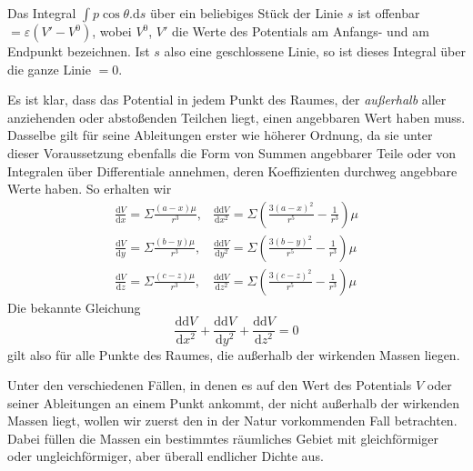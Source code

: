 Das Integral $\int p\cos\theta.\mathrm{d}s$ über ein beliebiges Stück der Linie $s$ ist offenbar $=\varepsilon(V'-V^0)$, wobei $V^0$, $V'$ die Werte des Potentials am Anfangs- und am Endpunkt bezeichnen. Ist $s$ also eine geschlossene Linie, so ist dieses Integral über die ganze Linie $=0$.

Es ist klar, dass das Potential in jedem Punkt des Raumes, der \textit{außerhalb} aller anziehenden oder abstoßenden Teilchen liegt, einen angebbaren Wert haben muss. Dasselbe gilt für seine Ableitungen erster wie höherer Ordnung, da sie unter dieser Voraussetzung ebenfalls die Form von Summen angebbarer Teile oder von Integralen über Differentiale annehmen, deren Koeffizienten durchweg angebbare Werte haben. So erhalten wir
\[
\begin{array}{ll}
\displaystyle\frac{\mathrm{d}V}{\mathrm{d}x}=\Sigma\frac{(a-x)\mu}{r^3},&\displaystyle\frac{\mathrm{d}\mathrm{d}V}{\mathrm{d}x^2}=\Sigma(\frac{3(a-x)^2}{r^5}-\frac{1}{r^3})\mu\\[6pt]
\displaystyle\frac{\mathrm{d}V}{\mathrm{d}y}=\Sigma\frac{(b-y)\mu}{r^3},&\displaystyle\frac{\mathrm{d}\mathrm{d}V}{\mathrm{d}y^2}=\Sigma(\frac{3(b-y)^2}{r^5}-\frac{1}{r^3})\mu\\[6pt]
\displaystyle\frac{\mathrm{d}V}{\mathrm{d}z}=\Sigma\frac{(c-z)\mu}{r^3},&\displaystyle\frac{\mathrm{d}\mathrm{d}V}{\mathrm{d}z^2}=\Sigma(\frac{3(c-z)^2}{r^5}-\frac{1}{r^3})\mu
\end{array}
\]
Die bekannte Gleichung
\[
\frac{\mathrm{d}\mathrm{d}V}{\mathrm{d}x^2}+\frac{\mathrm{d}\mathrm{d}V}{\mathrm{d}y^2}+\frac{\mathrm{d}\mathrm{d}V}{\mathrm{d}z^2}=0
\]
gilt also für alle Punkte des Raumes, die außerhalb der wirkenden Massen liegen.

Unter den verschiedenen Fällen, in denen es auf den Wert des Potentials $V$ oder seiner Ableitungen an einem Punkt ankommt, der nicht außerhalb der wirkenden Massen liegt, wollen wir zuerst den in der Natur vorkommenden Fall betrachten. Dabei füllen die Massen ein bestimmtes räumliches Gebiet mit gleichförmiger oder ungleichförmiger, aber überall endlicher Dichte aus.

